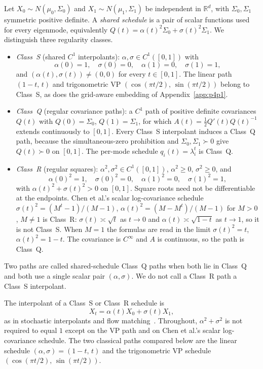 \documentclass[11pt,a4paper]{article}
\theoremstyle{remark}
\newcommand{\RR}{\mathbb{R}}
\begin{document}
Let $X_0\sim N(\mu_0,\Sigma_0)$ and $X_1\sim N(\mu_1,\Sigma_1)$ be independent
in $\RR^d$, with $\Sigma_0,\Sigma_1$ symmetric positive definite. A
\emph{shared schedule} is a pair of scalar functions used for every
eigenmode, equivalently $Q(t)=\alpha(t)^2\Sigma_0+\sigma(t)^2\Sigma_1$.
We distinguish three regularity classes.
\begin{itemize}[leftmargin=1.4em]
\item \emph{Class~S} (shared $C^1$ interpolants): $\alpha,\sigma\in C^1([0,1])$
  with
\begin{equation}
  \alpha(0)=1,\quad \sigma(0)=0,\quad \alpha(1)=0,\quad \sigma(1)=1,
\end{equation}
  and $(\alpha(t),\sigma(t))\neq(0,0)$ for every $t\in[0,1]$. The linear
  path $(1-t,\,t)$ and trigonometric VP
  $(\cos(\pi t/2),\,\sin(\pi t/2))$ belong to Class~S, as does the
  grid-aware embedding of Appendix~\ref{app:p4p1}.
\item \emph{Class~Q} (regular covariance paths): a $C^1$ path of positive
  definite covariances $Q(t)$ with $Q(0)=\Sigma_0$, $Q(1)=\Sigma_1$, for
  which $A(t)=\tfrac12 Q'(t)Q(t)^{-1}$ extends continuously to $[0,1]$.
  Every Class~S interpolant induces a Class~Q path, because the
  simultaneous-zero prohibition and $\Sigma_0,\Sigma_1\succ 0$ give
  $Q(t)\succ 0$ on $[0,1]$. The per-mode schedule $q_i(t)=\lambda_i^t$ is
  Class~Q.
\item \emph{Class~R} (regular squares): $\alpha^2,\sigma^2\in C^1([0,1])$,
  $\alpha^2\ge 0$, $\sigma^2\ge 0$, and
  \begin{equation}
    \alpha(0)^2=1,\quad \sigma(0)^2=0,\quad \alpha(1)^2=0,\quad \sigma(1)^2=1,
  \end{equation}
  with $\alpha(t)^2+\sigma(t)^2>0$ on $[0,1]$. Square roots need not be
  differentiable at the endpoints. Chen et al.'s scalar log-covariance
  schedule $\sigma(t)^2=(M^t-1)/(M-1)$,
  $\alpha(t)^2=(M-M^t)/(M-1)$ for $M>0$, $M\neq 1$ is Class~R:
  $\sigma(t)\asymp\sqrt{t}$ as $t\to 0$ and $\alpha(t)\asymp\sqrt{1-t}$ as
  $t\to 1$, so it is not Class~S. When $M=1$ the formulas are read in the
  limit $\sigma(t)^2=t$, $\alpha(t)^2=1-t$. The covariance is $C^\infty$
  and $A$ is continuous, so the path is Class~Q.
\end{itemize}
Two paths are called shared-schedule Class~Q paths when both lie in
Class~Q and both use a single scalar pair $(\alpha,\sigma)$. We do not
call a Class~R path a Class~S interpolant.

The interpolant of a Class~S or Class~R schedule is
\begin{equation}
  X_t=\alpha(t)X_0+\sigma(t)X_1,
  \label{eq:interpolant}
\end{equation}
as in stochastic interpolants and flow matching~\citep{albergo2025stochastic,lipman2023flow,liu2023rectified,tong2024conditional}.
Throughout, $\alpha^2+\sigma^2$ is not required to equal $1$ except on the VP
path and on Chen et al.'s scalar log-covariance schedule. The two classical
paths compared below are the linear schedule $(\alpha,\sigma)=(1-t,\,t)$ and
the trigonometric VP schedule $(\cos(\pi t/2),\,\sin(\pi t/2))$.
\end{document}
